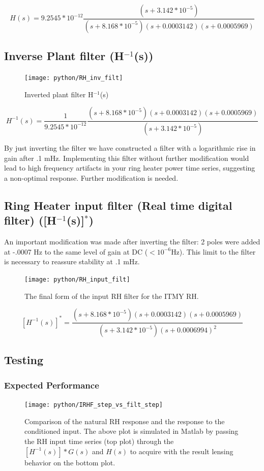 \documentclass[colorlinks=true,pdfstartview=FitV,linkcolor=blue,
            citecolor=magenta,urlcolor=red]{ligodoc}
\begin{document}
$$ H(s) = 9.2545*10^{-12} \frac{(s+3.142*10^{-5})}{(s+ 8.168*10^{-5}) (s+0.0003142) (s+0.0005969)} $$


\subsection{Inverse Plant filter (H$^{-1}$(s))}
\begin{figure}[H]
\texttt{[image: python/RH\_inv\_filt]}
\caption{Inverted plant filter H$^{-1}$(s)}
\label{fig:inv_plant_filt}
\end{figure}

$$ H^{-1}(s) = \frac{1}{9.2545*10^{-12}} \frac{(s+ 8.168*10^{-5}) (s+0.0003142) (s+0.0005969)}{(s+3.142*10^{-5})} $$

By just inverting the filter we have constructed a filter with a logarithmic rise in gain after .1 mHz. Implementing this filter without further modification would lead to high frequency artifacts in your ring heater power time series, suggesting a non-optimal response. Further modification is needed.

\newpage

\subsection{Ring Heater input filter (Real time digital filter) ([H$^{-1}$(s)]$^{*}$)}
An important modification was made after inverting the filter: 2 poles were added at -.0007 Hz to the same level of gain at DC ($<10^{-6}$Hz). This limit to the filter is necessary to reassure stability at .1 mHz.

\begin{figure}[H]
\texttt{[image: python/RH\_input\_filt]}
\caption{The final form of the input RH filter for the ITMY RH.}
\label{fig:inv_plant_filt_mod}
\end{figure}

$$ [H^{-1}(s)]^{*} = \frac{(s+8.168*10^{-5}) (s+0.0003142) (s+0.0005969)}{(s+3.142*10^{-5}) (s+0.0006994)^2} $$


\newpage
\subsection{Testing}
\subsubsection{Expected Performance}

\begin{figure}[H]
\texttt{[image: python/IRHF\_step\_vs\_filt\_step]}
\caption{Comparison of the natural RH response and the response to the conditioned input. The above plot is simulated in Matlab by passing the RH input time series (top plot) through the $[H^{-1}(s)]*G(s)$ and $H(s)$ to acquire with the result lensing behavior on the bottom plot.}
\label{fig:comparison}
\end{figure}
\end{document}

